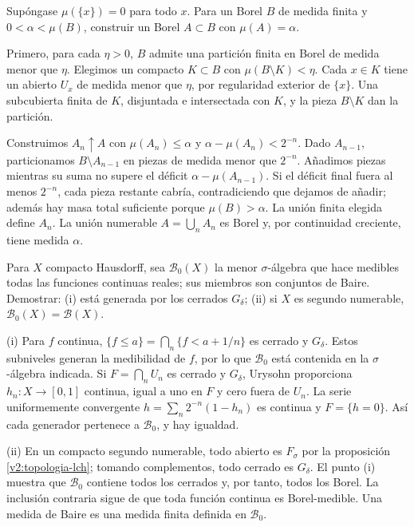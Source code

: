 \begin{ejercicio}\label{ej:v2-l31-7}
Supóngase $\mu(\{x\})=0$ para todo $x$. Para un Borel $B$ de medida finita y $0<\alpha<\mu(B)$, construir un Borel $A\subset B$ con $\mu(A)=\alpha$.
\end{ejercicio}
\begin{solucion}
Primero, para cada $\eta>0$, $B$ admite una partición finita en Borel de medida menor que $\eta$. Elegimos un compacto $K\subset B$ con $\mu(B\setminus K)<\eta$. Cada $x\in K$ tiene un abierto $U_x$ de medida menor que $\eta$, por regularidad exterior de $\{x\}$. Una subcubierta finita de $K$, disjuntada e intersectada con $K$, y la pieza $B\setminus K$ dan la partición.

Construimos $A_n\uparrow A$ con $\mu(A_n)\le\alpha$ y $\alpha-\mu(A_n)<2^{-n}$. Dado $A_{n-1}$, particionamos $B\setminus A_{n-1}$ en piezas de medida menor que $2^{-n}$. Añadimos piezas mientras su suma no supere el déficit $\alpha-\mu(A_{n-1})$. Si el déficit final fuera al menos $2^{-n}$, cada pieza restante cabría, contradiciendo que dejamos de añadir; además hay masa total suficiente porque $\mu(B)>\alpha$. La unión finita elegida define $A_n$. La unión numerable $A=\bigcup_nA_n$ es Borel y, por continuidad creciente, tiene medida $\alpha$.
\end{solucion}

\begin{ejercicio}\label{ej:v2-l31-8}
Para $X$ compacto Hausdorff, sea $\mathcal B_0(X)$ la menor $\sigma$-álgebra que hace medibles todas las funciones continuas reales; sus miembros son conjuntos de Baire. Demostrar: (i) está generada por los cerrados $G_\delta$; (ii) si $X$ es segundo numerable, $\mathcal B_0(X)=\mathcal B(X)$.
\end{ejercicio}
\begin{solucion}
(i) Para $f$ continua, $\{f\le a\}=\bigcap_n\{f<a+1/n\}$ es cerrado y $G_\delta$. Estos subniveles generan la medibilidad de $f$, por lo que $\mathcal B_0$ está contenida en la $\sigma$-álgebra indicada. Si $F=\bigcap_nU_n$ es cerrado y $G_\delta$, Urysohn proporciona $h_n:X\to[0,1]$ continua, igual a uno en $F$ y cero fuera de $U_n$. La serie uniformemente convergente $h=\sum_n2^{-n}(1-h_n)$ es continua y $F=\{h=0\}$. Así cada generador pertenece a $\mathcal B_0$, y hay igualdad.

(ii) En un compacto segundo numerable, todo abierto es $F_\sigma$ por la proposición \ref{v2:topologia-lch}; tomando complementos, todo cerrado es $G_\delta$. El punto (i) muestra que $\mathcal B_0$ contiene todos los cerrados y, por tanto, todos los Borel. La inclusión contraria sigue de que toda función continua es Borel-medible. Una medida de Baire es una medida finita definida en $\mathcal B_0$.
\end{solucion}

